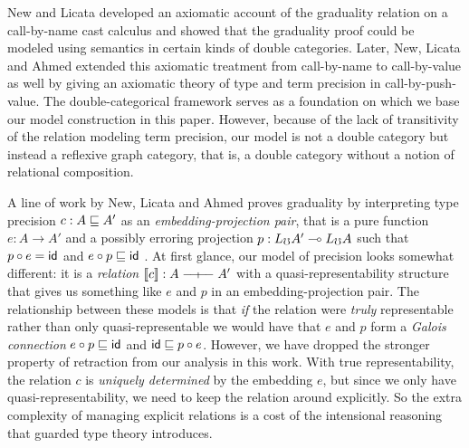 New and Licata \cite{new-licata18} developed an axiomatic account of the
graduality relation on a call-by-name cast calculus and showed that the
graduality proof could be modeled using semantics in certain kinds of double
categories.
%
Later, New, Licata and Ahmed \cite{new-licata-ahmed2019} extended this axiomatic
treatment from call-by-name to call-by-value as well by giving an axiomatic
theory of type and term precision in call-by-push-value. The double-categorical
framework serves as a foundation on which we base our model construction in this
paper. However, because of the lack of transitivity of the relation modeling
term precision, our model is not a double category but instead a reflexive graph
category, that is, a double category without a notion of relational composition.




A line of work by New, Licata and Ahmed proves graduality by
interpreting type precision $c : A \sqsubseteq A'$ as an
\emph{embedding-projection pair}, that is a pure function $e : A \to
A'$ and a possibly erroring projection $p : L_\mho A' \multimap L_\mho A$
such that $p \circ e = \mathsf{id}$ and $e \circ p \sqsubseteq \mathsf{id}$
\cite{new-ahmed2018,new-licata18,new-licata-ahmed2019}. At first glance, our model
of precision looks somewhat different: it is a \emph{relation}
$\sem{c} : A \rel A'$ with a quasi-representability structure that
gives us something like $e$ and $p$ in an embedding-projection
pair. The relationship between these models is that \emph{if} the
relation were \emph{truly} representable rather than only
quasi-representable we would have that $e$ and $p$ form a \emph{Galois
connection} $e \circ p \sqsubseteq \mathsf{id}$ and $\mathsf{id} \sqsubseteq p \circ
e$. However, we have dropped the stronger property of retraction from
our analysis in this work. With true representability, the relation
$c$ is \emph{uniquely determined} by the embedding $e$, but since we
only have quasi-representability, we need to keep the relation around
explicitly. So the extra complexity of managing explicit relations is
a cost of the intensional reasoning that guarded type theory
introduces.

